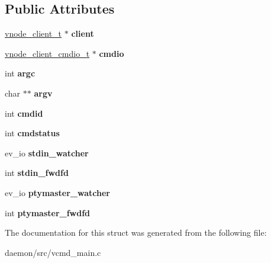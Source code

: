 \subsection*{Public Attributes}
\begin{DoxyCompactItemize}
\item 
\hypertarget{structvcmd__t_a858f99708304147fe767866579dfef8b}{\hyperlink{structvnode__client}{vnode\+\_\+client\+\_\+t} $\ast$ {\bfseries client}}\label{structvcmd__t_a858f99708304147fe767866579dfef8b}

\item 
\hypertarget{structvcmd__t_a465f6ccde75bae8ba6ecebf59b5450cc}{\hyperlink{structvnode__client__cmdio__t}{vnode\+\_\+client\+\_\+cmdio\+\_\+t} $\ast$ {\bfseries cmdio}}\label{structvcmd__t_a465f6ccde75bae8ba6ecebf59b5450cc}

\item 
\hypertarget{structvcmd__t_a7f7632999a5610818f6391936ee98e8e}{int {\bfseries argc}}\label{structvcmd__t_a7f7632999a5610818f6391936ee98e8e}

\item 
\hypertarget{structvcmd__t_ac8d63d1ced32d1b633518ac320e2e514}{char $\ast$$\ast$ {\bfseries argv}}\label{structvcmd__t_ac8d63d1ced32d1b633518ac320e2e514}

\item 
\hypertarget{structvcmd__t_af7280e926adda6b5413ee3ea9f6f8b4d}{int {\bfseries cmdid}}\label{structvcmd__t_af7280e926adda6b5413ee3ea9f6f8b4d}

\item 
\hypertarget{structvcmd__t_a99ad93b71d7444046c9e32f4b0bd876d}{int {\bfseries cmdstatus}}\label{structvcmd__t_a99ad93b71d7444046c9e32f4b0bd876d}

\item 
\hypertarget{structvcmd__t_a6908001e5d85224d208f63026ada0cf2}{ev\+\_\+io {\bfseries stdin\+\_\+watcher}}\label{structvcmd__t_a6908001e5d85224d208f63026ada0cf2}

\item 
\hypertarget{structvcmd__t_a35b10d28a63bd5a5d8208aed6eb00747}{int {\bfseries stdin\+\_\+fwdfd}}\label{structvcmd__t_a35b10d28a63bd5a5d8208aed6eb00747}

\item 
\hypertarget{structvcmd__t_ada4d632b9cd8224eb81c4b2135ce80d2}{ev\+\_\+io {\bfseries ptymaster\+\_\+watcher}}\label{structvcmd__t_ada4d632b9cd8224eb81c4b2135ce80d2}

\item 
\hypertarget{structvcmd__t_abd537075acf866dfa6b4325ece369554}{int {\bfseries ptymaster\+\_\+fwdfd}}\label{structvcmd__t_abd537075acf866dfa6b4325ece369554}

\end{DoxyCompactItemize}


The documentation for this struct was generated from the following file\+:\begin{DoxyCompactItemize}
\item 
daemon/src/vcmd\+\_\+main.\+c\end{DoxyCompactItemize}
